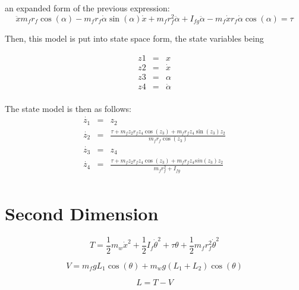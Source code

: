 \documentclass{article}
\begin{document}
an expanded form of the previous expression:
\begin{equation}
 \ddot{x} m_{f} r_{f} \cos(\alpha) - m_{f} r_{f} \dot{\alpha} \sin(\alpha) \dot{x} + m_{f} r_{f}^2 \ddot{\alpha} + I_{fg} \ddot{\alpha} - m_{f} \dot{x} r_{f} \dot{\alpha} \cos(\alpha) = \tau       
\end{equation}

Then, this model is put into state space form, the state variables being

\begin{eqnarray}
z1 &=& x \nonumber \\
z2 &=& \dot{x} \nonumber \\
z3 &=& \alpha \nonumber \\
z4 &=& \dot{\alpha} \nonumber \\
\end{eqnarray}

The state model is then as follows:
\begin{eqnarray}
\dot{z_{1}} &=& z_{2} \nonumber \\
\dot{z_{2}} &=& \frac{\tau + m_{f} z_{2} r_{f} z_{4}  \cos(z_{3}) + m_{f} r_{f} z_{4} \sin(z_{3}) z_{2}}{m_{f} r_{f} \cos(z_{3})} \nonumber \\
\dot{z_{3}} &=& z_{4} \nonumber \\
\dot{z_{4}} &=& \frac{\tau + m_{f} z_{2} r_{f} z_{4} \cos(z_{3}) + m_{f} r_{f} z_{4} sin(z_{3}) z_{2}}{m_{f} r_{f}^2 + I_{fg}} \nonumber \\
\end{eqnarray}

\newpage

 
\section{Second Dimension}

 
 
\begin{equation}
T = \frac{1}{2} m_{w} \dot{x}^2 + \frac{1}{2} I_{f} \dot{\theta}^2 + \tau \theta + \frac{1}{2} m_{f} r_{f}^2 \dot{\theta}^2
\end{equation}

\begin{equation}
V = m_{f} g L_{1} \cos(\theta) + m_{w} g (L_{1} + L_{2}) \cos(\theta)
\end{equation}

\begin{equation}
L = T - V
\end{equation}
\end{document}
